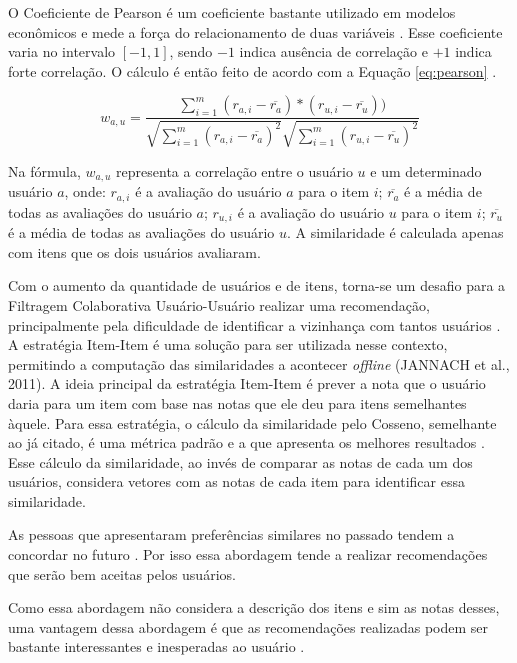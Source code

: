 O Coeficiente de Pearson é um coeficiente bastante utilizado em modelos econômicos e mede a força do relacionamento
de duas variáveis \cite{torres2004personalizaccao}. Esse coeficiente varia no intervalo $[-1, 1]$, sendo $-1$ indica
ausência de correlação e $+1$ indica forte correlação. O cálculo é então feito de acordo com a Equação \ref{eq:pearson}
\cite{torres2004personalizaccao}.

\begin{equation}
  w_{a,u} = \frac{\sum_{i=1}^{m}(r_{a,i} - \overline{r_a})*(r_{u,i} - \overline{r_u}))}{\sqrt{\sum_{i=1}^{m}(r_{a,i} - \overline{r_a})^2} \sqrt{\sum_{i=1}^{m}(r_{u,i} - \overline{r_u})^2}}
  \label{eq:pearson}
\end{equation}

Na fórmula, $w_{a,u}$ representa a correlação entre o usuário $u$ e um determinado usuário $a$, onde: $r_{a,i}$ é a avaliação
do usuário $a$ para o item $i$; $\overline{r_a}$ é a média de todas as avaliações do usuário $a$; $r_{u,i}$ é a avaliação do usuário
$u$ para o item $i$; $\overline{r_u}$ é a média de todas as avaliações do usuário $u$. A similaridade é calculada apenas com
itens que os dois usuários avaliaram.

Com o aumento da quantidade de usuários e de itens, torna-se um desafio para a Filtragem Colaborativa Usuário-Usuário
realizar uma recomendação, principalmente pela dificuldade de identificar a vizinhança com tantos usuários
\cite{jannach2010recommender}. A estratégia Item-Item é uma solução para ser utilizada nesse contexto, permitindo a
computação das similaridades a acontecer \textit{offline} (JANNACH et al., 2011). A ideia principal da estratégia Item-Item
é prever a nota que o usuário daria para um item com base nas notas que ele deu para itens semelhantes àquele. Para
essa estratégia, o cálculo da similaridade pelo Cosseno, semelhante ao já citado, é uma métrica padrão e a que
apresenta os melhores resultados \cite{jannach2010recommender}. Esse cálculo da similaridade, ao invés de comparar
as notas de cada um dos usuários, considera vetores com as notas de cada item para identificar essa similaridade.

As pessoas que apresentaram preferências similares no passado tendem a concordar no futuro \cite{ricci2011introduction}.
Por isso essa abordagem tende a realizar recomendações que serão bem aceitas pelos usuários.

Como essa abordagem não considera a descrição dos itens e sim as notas desses, uma vantagem dessa abordagem é que as
recomendações realizadas podem ser bastante interessantes e inesperadas ao usuário \cite{ricci2011introduction}.

